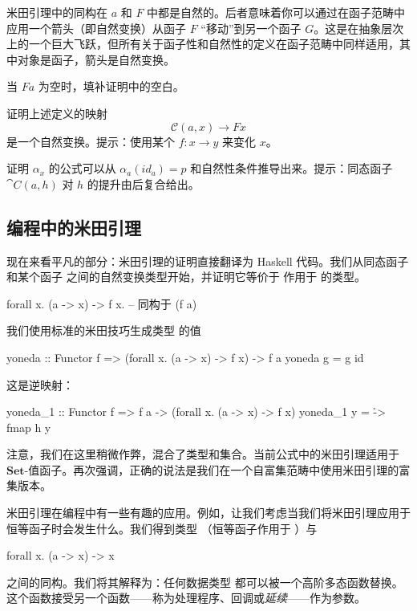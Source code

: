 \documentclass[DaoFP]{subfiles}
\begin{document}
米田引理中的同构在 $a$ 和 $F$ 中都是自然的。后者意味着你可以通过在函子范畴中应用一个箭头（即自然变换）从函子 $F$ “移动”到另一个函子 $G$。这是在抽象层次上的一个巨大飞跃，但所有关于函子性和自然性的定义在函子范畴中同样适用，其中对象是函子，箭头是自然变换。

\begin{exercise}
当 $F a$ 为空时，填补证明中的空白。
\end{exercise}
\begin{exercise}
证明上述定义的映射
\[ \mathcal{C}(a, x) \to F x\]
是一个自然变换。提示：使用某个 $f \colon x \to y$ 来变化 $x$。
\end{exercise}
\begin{exercise}
证明 $\alpha_x$ 的公式可以从 $\alpha_a (id_a) = p$ 和自然性条件推导出来。提示：同态函子 $\cat C(a, h)$ 对 $h$ 的提升由后复合给出。
\end{exercise}

\subsection{编程中的米田引理}

现在来看平凡的部分：米田引理的证明直接翻译为 Haskell 代码。我们从同态函子  和某个函子  之间的自然变换类型开始，并证明它等价于  作用于  的类型。
\begin{haskell}
forall x. (a -> x) -> f x.   -- 同构于 (f a)
\end{haskell}
我们使用标准的米田技巧生成类型  的值
\begin{haskell}
yoneda :: Functor f => (forall x. (a -> x) -> f x) -> f a
yoneda g = g id
\end{haskell}
这是逆映射：
\begin{haskell}
yoneda_1 :: Functor f => f a -> (forall x. (a -> x) -> f x)
yoneda_1 y = \h -> fmap h y
\end{haskell}

注意，我们在这里稍微作弊，混合了类型和集合。当前公式中的米田引理适用于 $\mathbf{Set}$-值函子。再次强调，正确的说法是我们在一个自富集范畴中使用米田引理的富集版本。

米田引理在编程中有一些有趣的应用。例如，让我们考虑当我们将米田引理应用于恒等函子时会发生什么。我们得到类型 （恒等函子作用于 ）与
\begin{haskell}
forall x. (a -> x) -> x
\end{haskell}
之间的同构。我们将其解释为：任何数据类型  都可以被一个高阶多态函数替换。这个函数接受另一个函数——称为处理程序、回调或\emph{延续}——作为参数。
\end{document}
